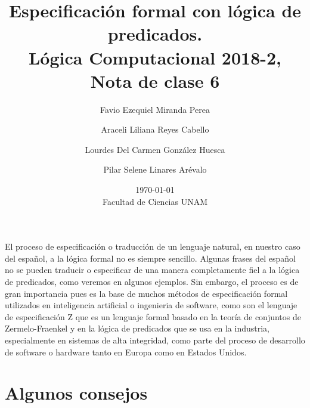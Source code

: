 \documentclass[11pt,letterpaper]{article}
\title{Especificación formal con lógica de predicados. \\ 
Lógica Computacional 2018-2, Nota de clase 6}
\author{Favio Ezequiel Miranda Perea \and Araceli Liliana Reyes Cabello \and
Lourdes Del Carmen Gonz\'alez Huesca \and Pilar Selene Linares Ar\'evalo}
\date{\today\\ Facultad de Ciencias UNAM}
\begin{document}
\maketitle

El proceso de especificación o traducción de un lenguaje natural, en 
nuestro caso del español, a la lógica formal no es siempre sencillo. Algunas 
frases del español no se pueden traducir o especificar de una manera 
completamente fiel a la lógica de predicados, como veremos en algunos ejemplos. 
Sin embargo, el proceso es de gran importancia pues es la base de muchos métodos 
de especificación formal utilizados en inteligencia artificial o ingenieria de 
software, como son el lenguaje de especificación \textsc{Z} que es un lenguaje 
formal basado en la teoría de conjuntos de Zermelo-Fraenkel y en la lógica de 
predicados que se usa en la industria, especialmente en sistemas de alta 
integridad, como parte del proceso de desarrollo de software o hardware
tanto en Europa como en Estados Unidos. %

\section{Algunos consejos}
\end{document}
